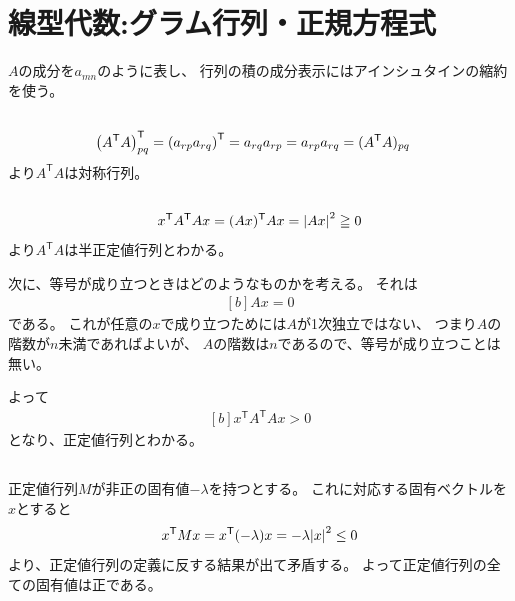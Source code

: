 \documentclass[../ap_2014.tex]{subfiles}
\begin{document}
\setcounter{chapter}{1}
\chapter{線型代数:グラム行列・正規方程式}
\(A\)の成分を\(a_{mn}\)のように表し、
行列の積の成分表示にはアインシュタインの縮約を使う。
\section{}
\begin{equation}\begin{aligned}[b]
    \qty(A^\mathsf{T}A)_{pq}^\mathsf{T}
    &= \qty(a_{rp}a_{rq})^\mathsf{T} = a_{rq}a_{rp}=a_{rp}a_{rq}=(A^\mathsf{T}A)_{pq}
\end{aligned}\end{equation}
より\(A^\mathsf{T}A\)は対称行列。

\section{}
\begin{equation}\begin{aligned}[b]
    x^\mathsf{T}A^\mathsf{T}Ax = (Ax)^\mathsf{T} Ax = \abs{Ax}^2 \geqq 0
\end{aligned}\end{equation}
より\(A^\mathsf{T}A\)は半正定値行列とわかる。

次に、等号が成り立つときはどのようなものかを考える。
それは
\begin{equation}\begin{aligned}[b]
    Ax = 0
\end{aligned}\end{equation}
である。
これが任意の\(x\)で成り立つためには\(A\)が1次独立ではない、
つまり\(A\)の階数が\(n\)未満であればよいが、
\(A\)の階数は\(n\)であるので、等号が成り立つことは無い。

よって
\begin{equation}\begin{aligned}[b]
    x^\mathsf{T}A^\mathsf{T}Ax > 0
\end{aligned}\end{equation}
となり、正定値行列とわかる。

\section{}
正定値行列\(M\)が非正の固有値\(-\lambda\)を持つとする。
これに対応する固有ベクトルを\(x\)とすると
\begin{equation}\begin{aligned}[b]
    x^\mathsf{T} Mx = x^\mathsf{T} (-\lambda)x = -\lambda\abs{x}^2 \leq0
\end{aligned}\end{equation}
より、正定値行列の定義に反する結果が出て矛盾する。
よって正定値行列の全ての固有値は正である。
\end{document}
